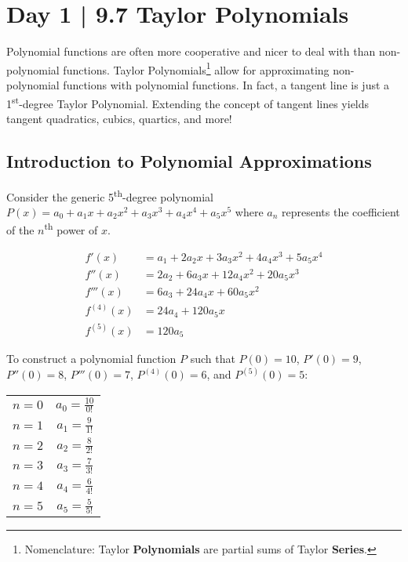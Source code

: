 \documentclass[10pt]{article}
\theoremstyle{definition}
\begin{document}
\section{Day 1 | 9.7 Taylor Polynomials}

Polynomial functions are often more cooperative and nicer to deal with than non-polynomial functions. Taylor Polynomials\footnote{Nomenclature: Taylor \textbf{Polynomials} are partial sums of Taylor \textbf{Series}.} allow for approximating non-polynomial functions with polynomial functions. In fact, a tangent line is just a 1\textsuperscript{st}-degree Taylor Polynomial. Extending the concept of tangent lines yields tangent quadratics, cubics, quartics, and more!

\subsection{Introduction to Polynomial Approximations}

Consider the generic 5\textsuperscript{th}-degree polynomial $P(x)=a_0 + a_1x + a_2x^2 + a_3x^3 + a_4x^4 + a_5x^5$ where $a_n$ represents the coefficient of the $n$\textsuperscript{th} power of $x$.

\begin{equation*}
\begin{split}
    f'(x)&= a_1 + 2a_2x + 3a_3x^2 + 4a_4x^3 + 5a_5x^4\\
    f''(x)&=2a_2 + 6a_3x + 12a_4x^2 + 20a_5x^3\\
    f'''(x)&=6a_3 + 24a_4x + 60a_5x^2\\
    f^{(4)}(x)&=24a_4 + 120a_5x\\
    f^{(5)}(x)&=120a_5
\end{split}
\end{equation*}

\vspace{0.5cm}
To construct a polynomial function $P$ such that $P(0)=10$, $P'(0)=9$, $P''(0)=8$, $P'''(0)=7$, $P^{(4)}(0)=6$, and $P^{(5)}(0)=5$:

\begin{center}
\begin{tabular}{c c}
$n=0$    &$a_0=\frac{10}{0!}$ \\
$n=1$    &$a_1=\frac{9}{1!}$ \\
$n=2$    &$a_2=\frac{8}{2!}$ \\
$n=3$    &$a_3=\frac{7}{3!}$ \\
$n=4$    &$a_4=\frac{6}{4!}$ \\
$n=5$    &$a_5=\frac{5}{5!}$ \\
\end{tabular}
\end{center}
\end{document}
